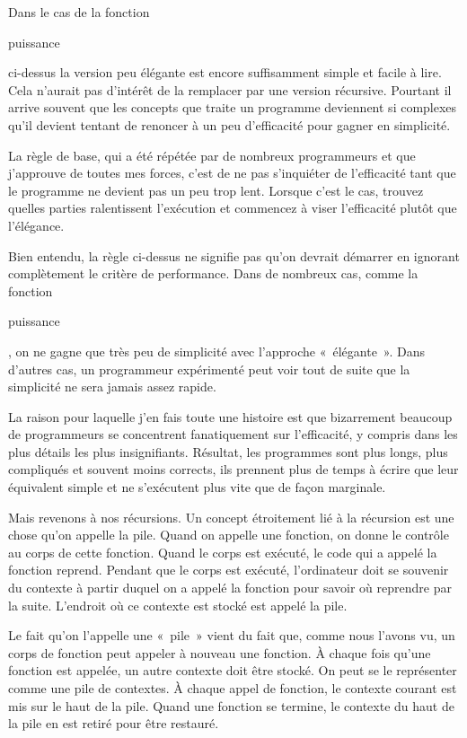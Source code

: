 \documentclass{FramateX}
\renewcommand{\texttt}[1]{\begin{sffamily}{#1}\end{sffamily}}
\begin{document}
Dans le cas de la fonction \texttt{puissance} ci-dessus la version peu
élégante est encore suffisamment simple et facile à lire. Cela n'aurait
pas d'intérêt de la remplacer par une version récursive. Pourtant il
arrive souvent que les concepts que traite un programme deviennent si
complexes qu'il devient tentant de renoncer à un peu d'efficacité pour
gagner en simplicité.

La règle de base, qui a été répétée par de nombreux programmeurs et que
j'approuve de toutes mes forces, c'est de ne pas s'inquiéter de
l'efficacité tant que le programme ne devient pas un peu trop lent.
Lorsque c'est le cas, trouvez quelles parties ralentissent l'exécution
et commencez à viser l'efficacité plutôt que l'élégance.

Bien entendu, la règle ci-dessus ne signifie pas qu'on devrait démarrer
en ignorant complètement le critère de performance. Dans de nombreux
cas, comme la fonction \texttt{puissance}, on ne gagne que très peu de
simplicité avec l'approche «~élégante~». Dans d'autres cas, un
programmeur expérimenté peut voir tout de suite que la simplicité ne
sera jamais assez rapide.

La raison pour laquelle j'en fais toute une histoire est que bizarrement
beaucoup de programmeurs se concentrent fanatiquement sur l'efficacité,
y compris dans les plus détails les plus insignifiants. Résultat, les
programmes sont plus longs, plus compliqués et souvent moins corrects,
ils prennent plus de temps à écrire que leur équivalent simple et ne
s'exécutent plus vite que de façon marginale.

\begin{center}\end{center}

Mais revenons à nos récursions. Un concept étroitement lié à la
récursion est une chose qu'on appelle la pile. Quand on appelle une
fonction, on donne le contrôle au corps de cette fonction. Quand le
corps est exécuté, le code qui a appelé la fonction reprend. Pendant que
le corps est exécuté, l'ordinateur doit se souvenir du contexte à partir
duquel on a appelé la fonction pour savoir où reprendre par la suite.
L'endroit où ce contexte est stocké est appelé la pile.

Le fait qu'on l'appelle une «~pile~» vient du fait que, comme nous
l'avons vu, un corps de fonction peut appeler à nouveau une fonction. À
chaque fois qu'une fonction est appelée, un autre contexte doit être
stocké. On peut se le représenter comme une pile de contextes. À chaque
appel de fonction, le contexte courant est mis sur le haut de la pile.
Quand une fonction se termine, le contexte du haut de la pile en est
retiré pour être restauré.
\end{document}
